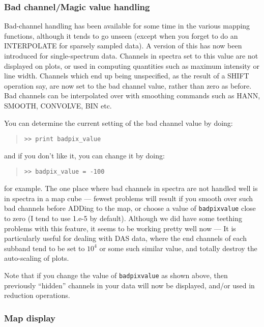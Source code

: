 \documentclass[twoside,11pt]{article}
\renewcommand{\_}{\texttt{\symbol{95}}}
\newenvironment{myquote}{\begin{quote}\begin{small}}{\end{small}\end{quote}}
\begin{document}
\subsubsection{Bad channel/Magic value handling}

Bad-channel handling has been available for some time in the various
mapping functions, although it tends to go unseen (except when you
forget to do an INTERPOLATE for sparsely sampled data). A version of
this has now been introduced for single-spectrum data. Channels in
spectra set to this value are not displayed on plots, or used in
computing quantities such as maximum intensity or line width. Channels
which end up being unspecified, as the result of a SHIFT operation say,
are now set to the bad channel value, rather than zero as before. Bad
channels can be interpolated over with smoothing commands such as HANN,
SMOOTH, CONVOLVE, BIN etc.

You can determine the current setting of the bad channel value by doing:
\begin{myquote}
\begin{verbatim}
>> print badpix_value
\end{verbatim}
\end{myquote}
and if you don't like it, you can change it by doing:
\begin{myquote}
\begin{verbatim}
>> badpix_value = -100
\end{verbatim}
\end{myquote}
for example. The one place where bad channels in spectra are not handled
well is in spectra in a map cube  --- fewest problems will result if you
smooth over such bad channels before ADDing to the map, or choose a value
of \texttt{badpix\_value} close to zero (I tend to use 1.e-5 by default). Although
we did have some teething problems with this feature, it seems to be working
pretty well now --- It is particularly useful for dealing with DAS data, where
the end channels of each subband tend to be set to $10^4$ or some such similar
value, and totally destroy the auto-scaling of plots.

Note that if you change the value of \texttt{badpix\_value} as shown above, then
previously ``hidden'' channels in your data will now be displayed, and/or
used in reduction operations.


\subsubsection{Map display}
\end{document}
